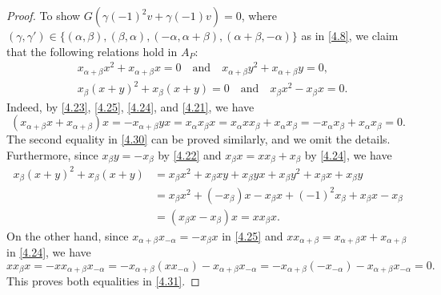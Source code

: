 \documentclass[12pt,a4paper,reqno]{amsart}
\numberwithin{equation}{section}
\numberwithin{equation}{section}
\theoremstyle{definition}
\def \al{\alpha}
\def \ga {\gamma}
\def \b {\beta}
\begin{document}
\begin{proof}
		To show $G(\ga(-1)^2v+\ga(-1)v)=0$, where $(\ga,\ga')\in \{ (\al,\b),(\b,\al),(-\al,\al+\b),(\al+\b,-\al)\}$ as in \eqref{4.8}, we claim that the following relations hold in $A_P$:
		\begin{align}
			&x_{\al+\b}x^2+x_{\al+\b}x=0\quad \text{and}\quad x_{\al+\b}y^2+x_{\al+\b}y=0,\label{4.30}\\
			&x_\b(x+y)^2+x_\b(x+y)=0\quad \text{and}\quad x_\b x^2-x_\b x=0.\label{4.31}
		\end{align}
		Indeed, by \eqref{4.23}, \eqref{4.25}, \eqref{4.24}, and \eqref{4.21}, we have 
		$$(x_{\al+\b}x+x_{\al+\b})x=-x_{\al+\b}yx=x_\al x_\b x=x_\al x x_\b+x_\al x_\b=-x_\al x_\b+x_\al x_\b=0.$$
		The second equality in \eqref{4.30} can be proved similarly, and we omit the details. Furthermore, since $x_\b y=-x_\b$ by \eqref{4.22} and $x_\b x=xx_\b+x_\b$ by \eqref{4.24}, we have 
		\begin{align*}
			x_\b(x+y)^2+x_\b(x+y)&=x_\b x^2+x_\b xy+x_\b yx+x_\b y^2+x_\b x+x_\b y\\
			&=x_\b x^2+(-x_\b)x-x_\b x+(-1)^2 x_\b +x_\b x-x_\b\\
			&=(x_\b x-x_\b)x=xx_\b x.
		\end{align*}
		On the other hand, since $x_{\al+\b}x_{-\al}=-x_\b x$ in \eqref{4.25} and $xx_{\al+\b}=x_{\al+\b}x+x_{\al+\b}$ in \eqref{4.24}, we have 
		$$xx_\b x=-xx_{\al+\b}x_{-\al}=-x_{\al+\b}(xx_{-\al})-x_{\al+\b}x_{-\al}=-x_{\al+\b}(-x_{-\al})-x_{\al+\b}x_{-\al}=0.$$
		This proves both equalities in \eqref{4.31}. 
		

\end{proof}
\end{document}
